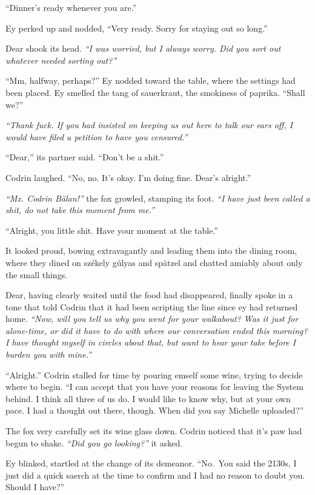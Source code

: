 ``Dinner's ready whenever you are.''

Ey perked up and nodded, ``Very ready. Sorry for staying out so long.''

Dear shook its head. \emph{``I was worried, but I always worry. Did you sort out whatever needed sorting out?''}

``Mm, halfway, perhaps?'' Ey nodded toward the table, where the settings had been placed. Ey smelled the tang of sauerkraut, the smokiness of paprika. ``Shall we?''

\emph{``Thank fuck. If you had insisted on keeping us out here to talk our ears off, I would have filed a petition to have you censured.''}

``Dear,'' its partner said. ``Don't be a shit.''

Codrin laughed. ``No, no. It's okay. I'm doing fine. Dear's alright.''

\emph{``Mx. Codrin Bălan!''} the fox growled, stamping its foot. \emph{``I have just been called a shit, do not take this moment from me.''}

``Alright, you little shit. Have your moment at the table.''

It looked proud, bowing extravagantly and leading them into the dining room, where they dined on székely gúlyas and spätzel and chatted amiably about only the small things.

Dear, having clearly waited until the food had disappeared, finally spoke in a tone that told Codrin that it had been scripting the line since ey had returned home. \emph{``Now, will you tell us why you went for your walkabout? Was it just for alone-time, or did it have to do with where our conversation ended this morning? I have thought myself in circles about that, but want to hear your take before I burden you with mine.''}

``Alright.'' Codrin stalled for time by pouring emself some wine, trying to decide where to begin. ``I can accept that you have your reasons for leaving the System behind. I think all three of us do. I would like to know why, but at your own pace. I had a thought out there, though. When did you say Michelle uploaded?''

The fox very carefully set its wine glass down. Codrin noticed that it's paw had begun to shake. \emph{``Did you go looking?''} it asked.

Ey blinked, startled at the change of its demeanor. ``No.~You said the 2130s, I just did a quick saerch at the time to confirm and I had no reason to doubt you. Should I have?''

